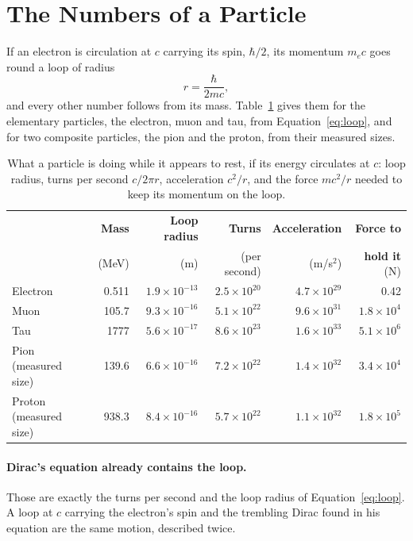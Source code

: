 \documentclass[11pt,a4paper]{article}
\begin{document}
\section{The Numbers of a Particle}
\label{sec:scale}

If an electron is circulation at $c$ carrying its spin, $\hbar/2$, its momentum $m_e c$ goes round a loop of radius
\begin{equation}
r = \frac{\hbar}{2 m c},
\label{eq:loop}
\end{equation}
and every other number follows from its mass. Table~\ref{tab:numbers} gives them for the elementary particles, the electron, muon and tau, from Equation~\eqref{eq:loop}, and for two composite particles, the pion and the proton, from their measured sizes.

\begin{table}[H]
\centering
\small
\renewcommand{\arraystretch}{1.25}
\begin{tabular}{@{}lrrrrr@{}}
\toprule
 & \textbf{Mass} & \textbf{Loop radius} & \textbf{Turns} & \textbf{Acceleration} & \textbf{Force to} \\
 & (MeV) & (m) & (per second) & (m/s$^2$) & \textbf{hold it} (N) \\
\midrule
Electron & 0.511 & $1.9\times10^{-13}$ & $2.5\times10^{20}$ & $4.7\times10^{29}$ & 0.42 \\
Muon & 105.7 & $9.3\times10^{-16}$ & $5.1\times10^{22}$ & $9.6\times10^{31}$ & $1.8\times10^{4}$ \\
Tau & 1777 & $5.6\times10^{-17}$ & $8.6\times10^{23}$ & $1.6\times10^{33}$ & $5.1\times10^{6}$ \\
Pion (measured size) & 139.6 & $6.6\times10^{-16}$ & $7.2\times10^{22}$ & $1.4\times10^{32}$ & $3.4\times10^{4}$ \\
Proton (measured size) & 938.3 & $8.4\times10^{-16}$ & $5.7\times10^{22}$ & $1.1\times10^{32}$ & $1.8\times10^{5}$ \\
\bottomrule
\end{tabular}
\caption{What a particle is doing while it appears to rest, if its energy circulates at $c$: loop radius, turns per second $c/2\pi r$, acceleration $c^2/r$, and the force $mc^2/r$ needed to keep its momentum on the loop. \hyptag}
\label{tab:numbers}
\end{table}

\paragraph{Dirac's equation already contains the loop.}  Those are exactly the turns per second and the loop radius of Equation~\eqref{eq:loop}. A loop at $c$ carrying the electron's spin and the trembling Dirac found in his equation are the same motion, described twice.
\end{document}
